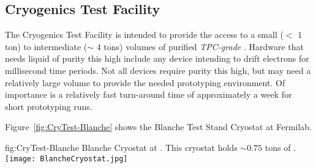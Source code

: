 \subsection{Cryogenics Test Facility}
\label{sec:fdgen-slow-cryo-test-facil}
The Cryogenics Test Facility is intended to provide the access to a small ($<$ \num{1} ton) to intermediate ($\sim$ \num{4} tons) volumes of purified \textit{TPC-grade} \lar{}. Hardware that needs liquid of purity this high include any device intending to drift electrons for millisecond time periods. Not all devices require purity this high, but may need a relatively large volume to provide the needed prototyping environment. Of importance is a relatively fast turn-around time of approximately a week for short prototyping runs.

Figure~\ref{fig:CryTest-Blanche} shows the Blanche Test Stand Cryostat at Fermilab.

\begin{dunefigure}{fig:CryTest-Blanche} 
  {Blanche Cryostat at \fnal. This cryostat holds $\sim 0.75$ tons of \lar{}.}
  \texttt{[image: BlancheCryostat.jpg]}%
\end{dunefigure}
